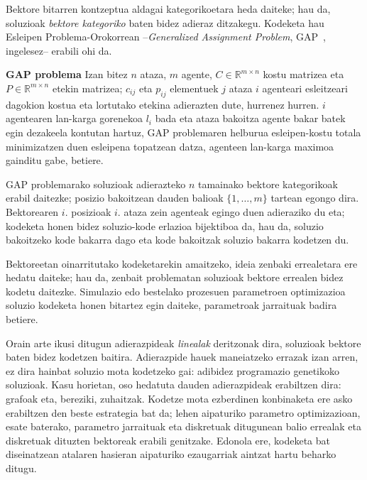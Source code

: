 \documentclass[eu]{ifirak}\usepackage[]{graphicx}\usepackage[]{color}
\begin{document}
Bektore bitarren kontzeptua aldagai kategorikoetara heda daiteke; hau da, soluzioak \textit{bektore kategoriko} baten bidez adieraz ditzakegu. Kodeketa hau Esleipen Problema-Orokorrean --\textit{Generalized Assignment Problem}, GAP~\cite{shmoys1993}, ingelesez-- erabili ohi da.

\begin{tcolorbox}
\begin{ifdefinition}{\bf GAP problema}
Izan bitez $n$ ataza, $m$ agente, $C\in \mathbb{R}^{m\times n}$ kostu matrizea eta $P\in \mathbb{R}^{m\times n}$ etekin matrizea; $c_{ij}$ eta $p_{ij}$ elementuek $j$ ataza $i$ agenteari esleitzeari dagokion kostua eta lortutako etekina adierazten dute, hurrenez hurren. $i$ agentearen lan-karga gorenekoa $l_i$ bada eta ataza bakoitza agente bakar batek egin dezakeela kontutan hartuz, GAP problemaren helburua esleipen-kostu totala minimizatzen duen esleipena topatzean datza, agenteen lan-karga maximoa gainditu gabe, betiere.
\end{ifdefinition}
\end{tcolorbox}

GAP problemarako soluzioak adierazteko $n$ tamainako bektore kategorikoak erabil daitezke; posizio bakoitzean dauden balioak $\{1,\ldots,m\}$ tartean egongo dira. Bektorearen $i$. posizioak $i$. ataza zein agenteak egingo duen adieraziko du eta; kodeketa honen bidez soluzio-kode erlazioa bijektiboa da, hau da, soluzio bakoitzeko kode bakarra dago eta kode bakoitzak soluzio bakarra kodetzen du.

Bektoreetan oinarritutako kodeketarekin amaitzeko, ideia zenbaki errealetara ere hedatu daiteke; hau da, zenbait problematan soluzioak bektore errealen bidez kodetu daitezke. Simulazio edo bestelako prozesuen parametroen optimizazioa soluzio kodeketa honen bitartez egin daiteke, parametroak jarraituak badira betiere.

Orain arte ikusi ditugun adierazpideak \textit{linealak} deritzonak dira, soluzioak bektore baten bidez kodetzen baitira. Adierazpide hauek maneiatzeko errazak izan arren, ez dira hainbat soluzio mota kodetzeko gai: adibidez programazio genetikoko soluzioak. Kasu horietan, oso hedatuta dauden adierazpideak erabiltzen dira: grafoak eta, bereziki, zuhaitzak. Kodetze mota ezberdinen konbinaketa ere asko erabiltzen den beste estrategia bat da; lehen aipaturiko parametro optimizazioan, esate baterako, parametro jarraituak eta diskretuak ditugunean balio errealak eta diskretuak dituzten bektoreak erabili genitzake. Edonola ere, kodeketa bat diseinatzean atalaren hasieran aipaturiko ezaugarriak aintzat hartu beharko ditugu.
\end{document}
